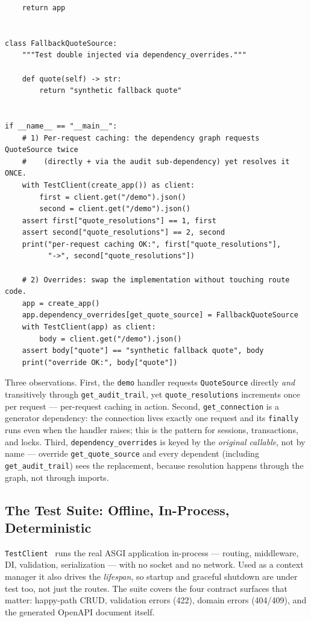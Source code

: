 \begin{verbatim}
    return app


class FallbackQuoteSource:
    """Test double injected via dependency_overrides."""

    def quote(self) -> str:
        return "synthetic fallback quote"


if __name__ == "__main__":
    # 1) Per-request caching: the dependency graph requests QuoteSource twice
    #    (directly + via the audit sub-dependency) yet resolves it ONCE.
    with TestClient(create_app()) as client:
        first = client.get("/demo").json()
        second = client.get("/demo").json()
    assert first["quote_resolutions"] == 1, first
    assert second["quote_resolutions"] == 2, second
    print("per-request caching OK:", first["quote_resolutions"],
          "->", second["quote_resolutions"])

    # 2) Overrides: swap the implementation without touching route code.
    app = create_app()
    app.dependency_overrides[get_quote_source] = FallbackQuoteSource
    with TestClient(app) as client:
        body = client.get("/demo").json()
    assert body["quote"] == "synthetic fallback quote", body
    print("override OK:", body["quote"])
\end{verbatim}


Three observations. First, the \texttt{demo} handler requests
\texttt{QuoteSource} directly \emph{and} transitively through
\texttt{get\_audit\_trail}, yet \texttt{quote\_resolutions} increments once
per request --- per-request caching in action. Second, \texttt{get\_connection}
is a generator dependency: the connection lives exactly one request and its
\texttt{finally} runs even when the handler raises; this is the pattern for
sessions, transactions, and locks. Third, \texttt{dependency\_overrides} is
keyed by the \emph{original callable}, not by name --- override
\texttt{get\_quote\_source} and every dependent (including
\texttt{get\_audit\_trail}) sees the replacement, because resolution happens
through the graph, not through imports.

\subsection{The Test Suite: Offline, In-Process, Deterministic}
\label{sec:ch6-code-tests}

\texttt{TestClient}~\cite{httpxdocs} runs the real ASGI application
in-process --- routing, middleware, DI, validation, serialization --- with no
socket and no network. Used as a context manager it also drives the
\emph{lifespan}, so startup and graceful shutdown are under test too, not
just the routes. The suite covers the four contract surfaces that matter:
happy-path CRUD, validation errors (422), domain errors (404/409), and the
generated OpenAPI document itself.

